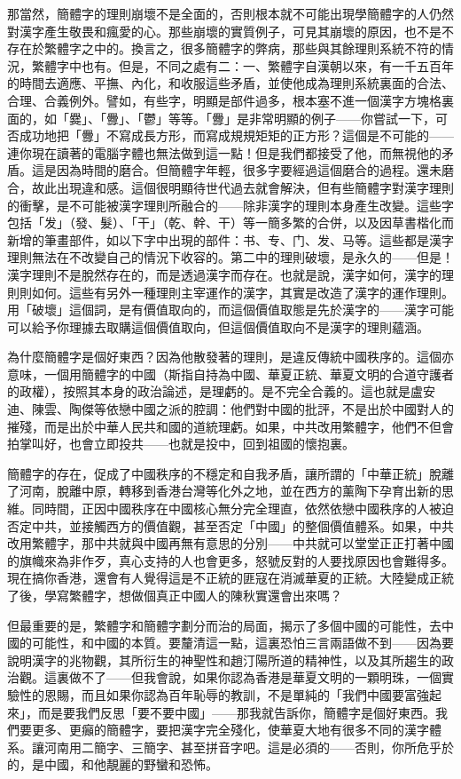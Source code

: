 \documentclass[a5paper, 10pt, openany]{book} %
\begin{document}
那當然，簡體字的理則崩壞不是全面的，否則根本就不可能出現學簡體字的人仍然對漢字產生敬畏和瘋愛的心。那些崩壞的實質例子，可見其崩壞的原因，也不是不存在於繁體字之中的。換言之，很多簡體字的弊病，那些與其餘理則系統不符的情況，繁體字中也有。但是，不同之處有二：一、繁體字自漢朝以來，有一千五百年的時間去適應、平撫、內化，和收服這些矛盾，並使他成為理則系統裏面的合法、合理、合義例外。譬如，有些字，明顯是部件過多，根本塞不進一個漢字方塊格裏面的，如「爨」、「釁」、「鬱」等等。「釁」是非常明顯的例子——你嘗試一下，可否成功地把「釁」不寫成長方形，而寫成規規矩矩的正方形？這個是不可能的——連你現在讀著的電腦字體也無法做到這一點！但是我們都接受了他，而無視他的矛盾。這是因為時間的磨合。但簡體字年輕，很多字要經過這個磨合的過程。還未磨合，故此出現違和感。這個很明顯待世代過去就會解決，但有些簡體字對漢字理則的衝擊，是不可能被漢字理則所融合的——除非漢字的理則本身產生改變。這些字包括「发」（發、髮）、「干」（乾、幹、干）等一簡多繁的合併，以及因草書楷化而新增的筆畫部件，如以下字中出現的部件：书、专、门、发、马等。這些都是漢字理則無法在不改變自己的情況下收容的。第二中的理則破壞，是永久的——但是！漢字理則不是脫然存在的，而是透過漢字而存在。也就是說，漢字如何，漢字的理則則如何。這些有另外一種理則主宰運作的漢字，其實是改造了漢字的運作理則。用「破壞」這個詞，是有價值取向的，而這個價值取態是先於漢字的——漢字可能可以給予你理據去取購這個價值取向，但這個價值取向不是漢字的理則蘊涵。

為什麼簡體字是個好東西？因為他散發著的理則，是違反傳統中國秩序的。這個亦意味，一個用簡體字的中國（斯指自持為中國、華夏正統、華夏文明的合道守護者的政權），按照其本身的政治論述，是理虧的。是不完全合義的。這也就是盧安迪、陳雲、陶傑等依戀中國之派的腔調：他們對中國的批評，不是出於中國對人的摧殘，而是出於中華人民共和國的道統理虧。如果，中共改用繁體字，他們不但會拍掌叫好，也會立即投共——也就是投中，回到祖國的懷抱裏。

簡體字的存在，促成了中國秩序的不穩定和自我矛盾，讓所謂的「中華正統」脫離了河南，脫離中原，轉移到香港台灣等化外之地，並在西方的薰陶下孕育出新的思維。同時間，正因中國秩序在中國核心無分完全理直，依然依戀中國秩序的人被迫否定中共，並接觸西方的價值觀，甚至否定「中國」的整個價值體系。如果，中共改用繁體字，那中共就與中國再無有意思的分別——中共就可以堂堂正正打著中國的旗幟來為非作歹，真心支持的人也會更多，怒號反對的人要找原因也會難得多。現在搞你香港，還會有人覺得這是不正統的匪寇在消滅華夏的正統。大陸變成正統了後，學寫繁體字，想做個真正中國人的陳秋實還會出來嗎？

但最重要的是，繁體字和簡體字劃分而治的局面，揭示了多個中國的可能性，去中國的可能性，和中國的本質。要釐清這一點，這裏恐怕三言兩語做不到——因為要說明漢字的兆物觀，其所衍生的神聖性和趙汀陽所道的精神性，以及其所趨生的政治觀。這裏做不了——但我會說，如果你認為香港是華夏文明的一顆明珠，一個實驗性的恩賜，而且如果你認為百年恥辱的教訓，不是單純的「我們中國要富強起來」，而是要我們反思「要不要中國」——那我就告訴你，簡體字是個好東西。我們要更多、更癲的簡體字，要把漢字完全殘化，使華夏大地有很多不同的漢字體系。讓河南用二簡字、三簡字、甚至拼音字吧。這是必須的——否則，你所危乎於的，是中國，和他靚麗的野蠻和恐怖。
\end{document}
